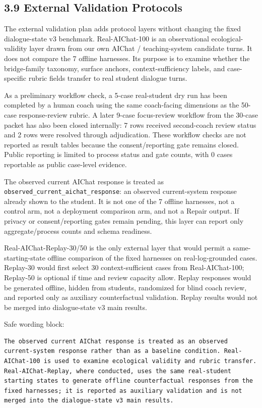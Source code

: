 \documentclass[11pt]{article}
\begin{document}
\subsection{3.9 External Validation Protocols}

The external validation plan adds protocol layers without changing the fixed dialogue-state v3 benchmark. Real-AIChat-100 is an observational ecological-validity layer drawn from our own AIChat / teaching-system candidate turns. It does not compare the 7 offline harnesses. Its purpose is to examine whether the bridge-family taxonomy, surface anchors, context-sufficiency labels, and case-specific rubric fields transfer to real student dialogue turns.

As a preliminary workflow check, a 5-case real-student dry run has been completed by a human coach using the same coach-facing dimensions as the 50-case response-review rubric. A later 9-case focus-review workflow from the 30-case packet has also been closed internally: 7 rows received second-coach review status and 2 rows were resolved through adjudication. These workflow checks are not reported as result tables because the consent/reporting gate remains closed. Public reporting is limited to process status and gate counts, with 0 cases reportable as public case-level evidence.

The observed current AIChat response is treated as \texttt{observed\_current\_aichat\_response}: an observed current-system response already shown to the student. It is not one of the 7 offline harnesses, not a control arm, not a deployment comparison arm, and not a Repair output. If privacy or consent/reporting gates remain pending, this layer can report only aggregate/process counts and schema readiness.

Real-AIChat-Replay-30/50 is the only external layer that would permit a same-starting-state offline comparison of the fixed harnesses on real-log-grounded cases. Replay-30 would first select 30 context-sufficient cases from Real-AIChat-100; Replay-50 is optional if time and review capacity allow. Replay responses would be generated offline, hidden from students, randomized for blind coach review, and reported only as auxiliary counterfactual validation. Replay results would not be merged into dialogue-state v3 main results.

Safe wording block:

\begin{verbatim}
The observed current AIChat response is treated as an observed current-system response rather than as a baseline condition. Real-AIChat-100 is used to examine ecological validity and rubric transfer. Real-AIChat-Replay, where conducted, uses the same real-student starting states to generate offline counterfactual responses from the fixed harnesses; it is reported as auxiliary validation and is not merged into the dialogue-state v3 main results.
\end{verbatim}
\end{document}
